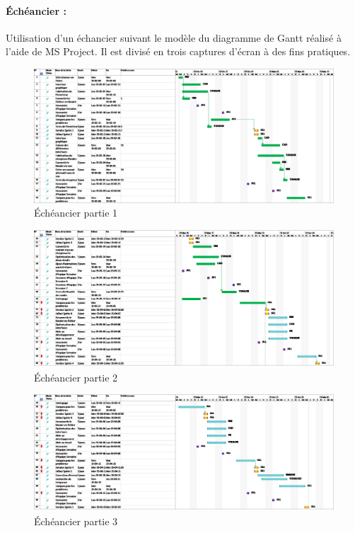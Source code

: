 \paragraph{Échéancier :}
Utilisation d'un échancier suivant le modèle du diagramme de Gantt réalisé à l'aide de MS Project. Il est divisé en trois captures d'écran à des fins pratiques.

\begin{figure}[ht!]
    \centering
    \caption{Échéancier partie 1}
    \includegraphics[width=0.8\linewidth]{images/echeancier/echeancier_sprint3_part1.png}
\end{figure}

\begin{figure}[ht!]
    \centering
    \caption{Échéancier partie 2}
    \includegraphics[width=0.8\linewidth]{images/echeancier/echeancier_sprint4_part2.png}
\end{figure}

\begin{figure}[ht!]
    \centering
    \caption{Échéancier partie 3}
    \includegraphics[width=0.8\linewidth]{images/echeancier/echeancier_sprint3_part3.png}
\end{figure}